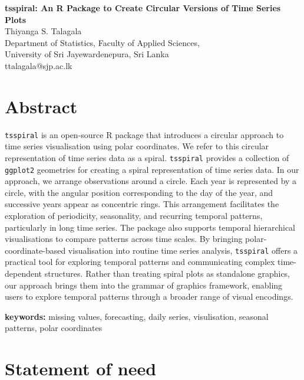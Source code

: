 \documentclass[
  12pt,
  a4paper,
]{article}
\author{}
\date{}
\begin{document}
\begin{center}
{\LARGE \textbf{tsspiral: An R Package to Create Circular Versions of Time Series Plots}}\\
Thiyanga S. Talagala \\
Department of Statistics, Faculty of Applied Sciences, \\
University of Sri Jayewardenepura, Sri Lanka \\
ttalagala@sjp.ac.lk
\end{center}

\section*{Abstract}\label{abstract}

\texttt{tsspiral} is an open-source R package that introduces a circular
approach to time series visualisation using polar coordinates. We refer
to this circular representation of time series data as a spiral.
\texttt{tsspiral} provides a collection of \texttt{ggplot2} geometries
for creating a spiral representation of time series data. In our
approach, we arrange observations around a circle. Each year is
represented by a circle, with the angular position corresponding to the
day of the year, and successive years appear as concentric rings. This
arrangement facilitates the exploration of periodicity, seasonality, and
recurring temporal patterns, particularly in long time series. The
package also supports temporal hierarchical visualisations to compare
patterns across time scales. By bringing polar-coordinate-based
visualisation into routine time series analysis, \texttt{tsspiral}
offers a practical tool for exploring temporal patterns and
communicating complex time-dependent structures. Rather than treating
spiral plots as standalone graphics, our approach brings them into the
grammar of graphics framework, enabling users to explore temporal
patterns through a broader range of visual encodings.

\textbf{keywords:} missing values, forecasting, daily series,
visulisation, seasonal patterns, polar coordinates

\section{Statement of need}\label{statement-of-need}
\end{document}
